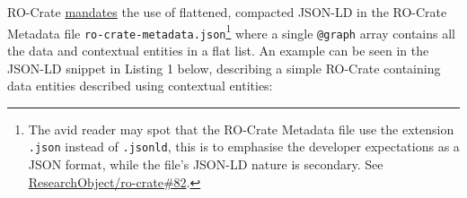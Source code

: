 RO-Crate
\href{https://www.researchobject.org/ro-crate/1.1/appendix/jsonld.html}{mandates}
the use of flattened, compacted JSON-LD in the RO-Crate Metadata file
\texttt{ro-crate-metadata.json}\footnote{The avid reader may spot that
  the RO-Crate Metadata file use the extension \texttt{.json} instead of
  \texttt{.jsonld}, this is to emphasise the developer expectations as a
  JSON format, while the file's JSON-LD nature is secondary. See
  \href{https://github.com/ResearchObject/ro-crate/issues/82}{ResearchObject/ro-crate\#82}.}
where a single \texttt{@graph} array contains all the data and
contextual entities in a flat list. An example can be seen in the
JSON-LD snippet in Listing 1 below, describing a simple RO-Crate
containing data entities described using contextual entities:

\begin{Shaded}
\begin{Highlighting}[]
\FunctionTok{\{} \FunctionTok{:} \FunctionTok{,}
  \FunctionTok{:} \OtherTok{[}
      \FunctionTok{\{} \FunctionTok{:} \FunctionTok{,}      
        \FunctionTok{:} \FunctionTok{,}
        \FunctionTok{:} \FunctionTok{\{}\FunctionTok{:} \FunctionTok{\},}
        \FunctionTok{:} \FunctionTok{\{}\FunctionTok{:} \FunctionTok{\}}
      \FunctionTok{\}}\OtherTok{,}
      \FunctionTok{\{} \FunctionTok{:} \FunctionTok{,}
        \FunctionTok{:} \FunctionTok{,}
        \FunctionTok{:} \FunctionTok{,}
        \FunctionTok{:} \FunctionTok{\{}\FunctionTok{:} \FunctionTok{\},}
        \FunctionTok{:} \FunctionTok{\{}\FunctionTok{:} \FunctionTok{\},}
        \FunctionTok{:} \FunctionTok{,}
        \FunctionTok{:} \OtherTok{[}
          \FunctionTok{\{}\FunctionTok{:} \FunctionTok{\}}\OtherTok{,}
          \FunctionTok{\{}\FunctionTok{:} \FunctionTok{\}}

\end{Highlighting}
\end{Shaded}
